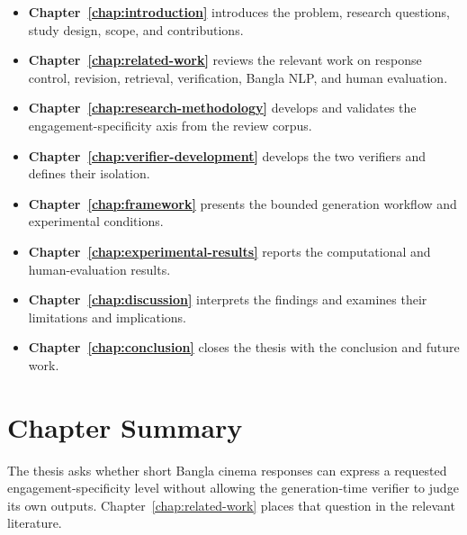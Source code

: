 \begin{itemize}
\item \textbf{Chapter~\ref{chap:introduction}} introduces the problem, research questions, study design, scope, and contributions.
\item \textbf{Chapter~\ref{chap:related-work}} reviews the relevant work on response control, revision, retrieval, verification, Bangla NLP, and human evaluation.
\item \textbf{Chapter~\ref{chap:research-methodology}} develops and validates the engagement-specificity axis from the review corpus.
\item \textbf{Chapter~\ref{chap:verifier-development}} develops the two verifiers and defines their isolation.
\item \textbf{Chapter~\ref{chap:framework}} presents the bounded generation workflow and experimental conditions.
\item \textbf{Chapter~\ref{chap:experimental-results}} reports the computational and human-evaluation results.
\item \textbf{Chapter~\ref{chap:discussion}} interprets the findings and examines their limitations and implications.
\item \textbf{Chapter~\ref{chap:conclusion}} closes the thesis with the conclusion and future work.
\end{itemize}

\section{Chapter Summary}

The thesis asks whether short Bangla cinema responses can express a requested engagement-specificity level without allowing the generation-time verifier to judge its own outputs. Chapter~\ref{chap:related-work} places that question in the relevant literature.
